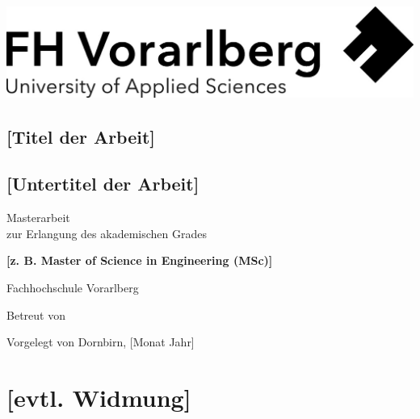 \documentclass[a4paper,12pt,twoside]{scrreprt}
\begin{document}
\cleardoublepage   %
\thispagestyle{empty}
\begin{titlepage}
  \begin{flushright}
  \includegraphics[width=0.4\linewidth]{Logo-A3}
  \end{flushright}
  \begin{flushleft}
  \section*{[Titel der Arbeit]}
  \subsection*{[Untertitel der Arbeit]}
  \vspace{1cm}
  
  Masterarbeit\\
  zur Erlangung des akademischen Grades
  \vspace{0.5cm}
  
  \textbf{[z. B. Master of Science in Engineering (MSc)]}

  \vspace{1cm}
  Fachhochschule Vorarlberg

  \vspace{0.5cm}
  
  Betreut von
  
  \vspace{0.5cm}
  
  Vorgelegt von\newline
  Dornbirn, [Monat Jahr]
  \end{flushleft}
\end{titlepage}


\newpage
\section*{[evtl. Widmung]}   %
\end{document}
